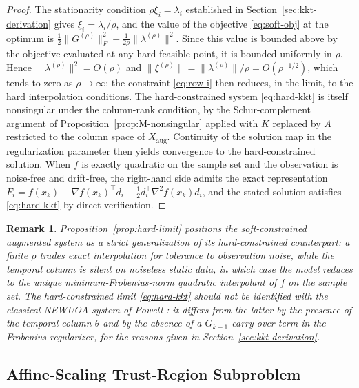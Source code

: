 \documentclass[11pt,a4paper]{article}
\newtheorem{remark}[theorem]{Remark}
\begin{document}
\begin{proof}
The stationarity condition $\rho \xi_i = \lambda_i$ established in
Section~\ref{sec:kkt-derivation} gives $\xi_i = \lambda_i/\rho$, and
the value of the objective \eqref{eq:soft-obj} at the optimum is
$\tfrac{1}{2}\|G^{(\rho)}\|_F^2 + \tfrac{1}{2\rho}
\|\lambda^{(\rho)}\|^2$. Since this value is bounded above by the
objective evaluated at any hard-feasible point, it is bounded
uniformly in $\rho$. Hence $\|\lambda^{(\rho)}\|^2 = O(\rho)$ and
$\|\xi^{(\rho)}\| = \|\lambda^{(\rho)}\|/\rho = O(\rho^{-1/2})$,
which tends to zero as $\rho \to \infty$; the constraint
\eqref{eq:row-i} then reduces, in the limit, to the hard
interpolation conditions. The hard-constrained system
\eqref{eq:hard-kkt} is itself nonsingular under the column-rank
condition, by the Schur-complement argument of
Proposition~\ref{prop:M-nonsingular} applied with $K$ replaced by
$A$ restricted to the column space of $X_{\mathrm{aug}}$. Continuity
of the solution map in the regularization parameter then yields
convergence to the hard-constrained solution. When $f$ is exactly
quadratic on the sample set and the observation is noise-free and
drift-free, the right-hand side admits the exact representation
$F_i = f(x_k) + \nabla f(x_k)^\top d_i + \tfrac{1}{2} d_i^\top
\nabla^2 f(x_k) d_i$, and the stated solution satisfies
\eqref{eq:hard-kkt} by direct verification.
\end{proof}

\begin{remark}\label{rem:newuoa-comparison}
Proposition~\ref{prop:hard-limit} positions the soft-constrained
augmented system as a strict generalization of its hard-constrained
counterpart: a finite $\rho$ trades exact interpolation for
tolerance to observation noise, while the temporal column is silent
on noiseless static data, in which case the model reduces to the
unique minimum-Frobenius-norm quadratic interpolant of $f$ on the
sample set. The hard-constrained limit \eqref{eq:hard-kkt} should
not be identified with the classical NEWUOA system of Powell
\cite{Powell2006NEWUOA}: it differs from the latter by the presence
of the temporal column $\theta$ and by the absence of a $G_{k-1}$
carry-over term in the Frobenius regularizer, for the reasons given
in Section~\ref{sec:kkt-derivation}.
\end{remark}

\subsection{Affine-Scaling Trust-Region Subproblem}
\label{sec:affine-coords}
\end{document}
